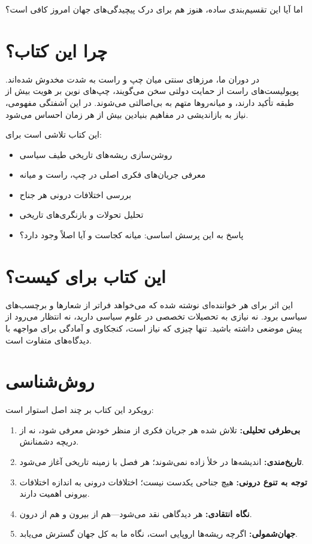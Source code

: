 اما آیا این تقسیم‌بندی ساده، هنوز هم برای درک پیچیدگی‌های جهان امروز کافی است؟

\section*{چرا این کتاب؟}

در دوران ما، مرزهای سنتی میان چپ و راست به شدت مخدوش شده‌اند. پوپولیست‌های راست از حمایت دولتی سخن می‌گویند، چپ‌های نوین بر هویت بیش از طبقه تأکید دارند، و میانه‌روها متهم به بی‌اصالتی می‌شوند. در این آشفتگی مفهومی، نیاز به بازاندیشی در مفاهیم بنیادین بیش از هر زمان احساس می‌شود.

این کتاب تلاشی است برای:

\begin{itemize}[nosep, rightmargin=1.5cm]
    \item روشن‌سازی ریشه‌های تاریخی طیف سیاسی
    \item معرفی جریان‌های فکری اصلی در چپ، راست و میانه
    \item بررسی اختلافات درونی هر جناح
    \item تحلیل تحولات و بازنگری‌های تاریخی
    \item پاسخ به این پرسش اساسی: میانه کجاست و آیا اصلاً وجود دارد؟
\end{itemize}

\section*{این کتاب برای کیست؟}

این اثر برای هر خواننده‌ای نوشته شده که می‌خواهد فراتر از شعارها و برچسب‌های سیاسی برود. نه نیازی به تحصیلات تخصصی در علوم سیاسی دارید، نه انتظار می‌رود از پیش موضعی داشته باشید. تنها چیزی که نیاز است، کنجکاوی و آمادگی برای مواجهه با دیدگاه‌های متفاوت است.

\section*{روش‌شناسی}

\vspace{-10pt}

رویکرد این کتاب بر چند اصل استوار است:

\begin{enumerate}[nosep, rightmargin=1.5cm]
    \item \textbf{بی‌طرفی تحلیلی:} تلاش شده هر جریان فکری از منظر خودش معرفی شود، نه از دریچه دشمنانش.
    
    \item \textbf{تاریخ‌مندی:} اندیشه‌ها در خلأ زاده نمی‌شوند؛ هر فصل با زمینه تاریخی آغاز می‌شود.
    
    \item \textbf{توجه به تنوع درونی:} هیچ جناحی یکدست نیست؛ اختلافات درونی به اندازه اختلافات بیرونی اهمیت دارند.
    
    \item \textbf{نگاه انتقادی:} هر دیدگاهی نقد می‌شود—هم از بیرون و هم از درون.
    
    \item \textbf{جهان‌شمولی:} اگرچه ریشه‌ها اروپایی است، نگاه ما به کل جهان گسترش می‌یابد.
\end{enumerate}

